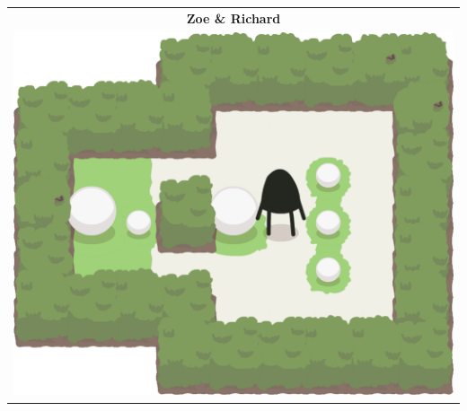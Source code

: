 \documentclass{report}
\theoremstyle{plain}
\begin{document}
\begin{center}
\begin{tabular}{c}
\end{tabular}
\begin{tabular}{c}
\textbf{Zoe \& Richard} \\
\includegraphics[scale=\levelAnnexWidth]{zoe-richard-1.png}
\end{tabular}
\end{center}

\newpage
\end{document}
